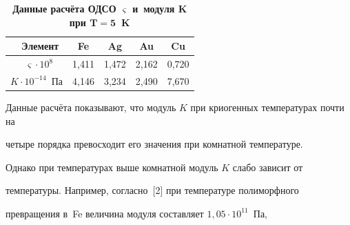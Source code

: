 \begin{table}[h!]

\centering

\begin{minipage}{.65\textwidth}

\centering

\caption{\bf Данные расчёта ОДСО $\boldsymbol\varsigma $ и~модуля $\boldsymbol K$ при $\boldsymbol{ T = 5 }$~K}

\vspace{-3mm}

\begin{tabular}{p{2cm}|c|c|c|c}

\hline

~~Элемент& 

Fe& 

Ag& 

Au& 

Cu \\

\hline

~~~$\varsigma \cdot  10^8$& 

1,411& 

1,472& 

2,162& 

0,720 \\


$K\cdot 10^{-14}$~Па& 

4,146& 

3,234& 

2,490& 

7,670 \\

\hline

\end{tabular} 

\end{minipage}

\end{table}



Данные расчёта показывают, что модуль $K$ при криогенных температурах почти на 

четыре порядка превосходит его значения при комнатной температуре.



Однако при температурах выше комнатной модуль $K$ слабо зависит от 

температуры. Например, согласно~[2] при температуре полиморфного 

превращения в~Fe величина модуля составляет $1{,}05\cdot 10^{11 }$~Па, 

